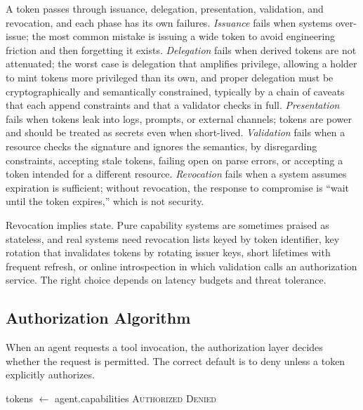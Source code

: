 \documentclass[11pt]{book}
\begin{document}
A token passes through issuance, delegation, presentation, validation, and revocation, and each phase has its own failures. \textit{Issuance} fails when systems over-issue; the most common mistake is issuing a wide token to avoid engineering friction and then forgetting it exists. \textit{Delegation} fails when derived tokens are not attenuated; the worst case is delegation that amplifies privilege, allowing a holder to mint tokens more privileged than its own, and proper delegation must be cryptographically and semantically constrained, typically by a chain of caveats that each append constraints and that a validator checks in full. \textit{Presentation} fails when tokens leak into logs, prompts, or external channels; tokens are power and should be treated as secrets even when short-lived. \textit{Validation} fails when a resource checks the signature and ignores the semantics, by disregarding constraints, accepting stale tokens, failing open on parse errors, or accepting a token intended for a different resource. \textit{Revocation} fails when a system assumes expiration is sufficient; without revocation, the response to compromise is ``wait until the token expires,'' which is not security.

Revocation implies state. Pure capability systems are sometimes praised as stateless, and real systems need revocation lists keyed by token identifier, key rotation that invalidates tokens by rotating issuer keys, short lifetimes with frequent refresh, or online introspection in which validation calls an authorization service. The right choice depends on latency budgets and threat tolerance.

\subsection{Authorization Algorithm}

When an agent requests a tool invocation, the authorization layer decides whether the request is permitted. The correct default is to deny unless a token explicitly authorizes.

\begin{algorithm}
\caption{Tool Authorization}
\begin{algorithmic}[1]
    \State tokens $\gets$ agent.capabilities
                                \State \Return \textsc{Authorized}
                            \EndIf
                        \EndIf
                    \EndIf
                \EndIf
            \EndIf
        \EndIf
    \EndFor
    \State \Return \textsc{Denied}
\EndFunction
\end{algorithmic}
\end{algorithm}
\end{document}
